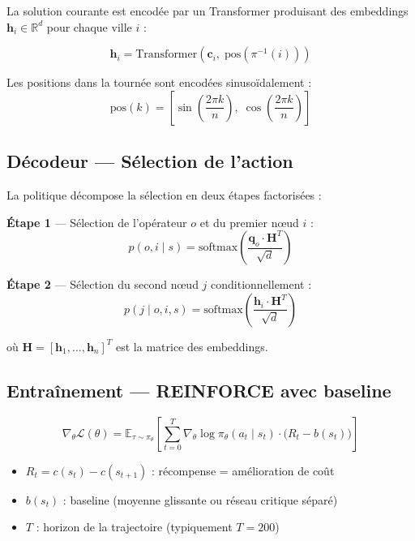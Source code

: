 \documentclass[11pt,a4paper]{article}
\begin{document}
La solution courante est encodée par un Transformer produisant des embeddings
$\mathbf{h}_i \in \mathbb{R}^d$ pour chaque ville $i$ :

\begin{equation}
  \mathbf{h}_i = \text{Transformer}\!\left(\mathbf{c}_i,\;
  \text{pos}\!\left(\pi^{-1}(i)\right)\right)
\end{equation}

Les positions dans la tournée sont encodées sinusoïdalement :
\begin{equation}
  \text{pos}(k) = \left[\sin\!\left(\frac{2\pi k}{n}\right),\;
  \cos\!\left(\frac{2\pi k}{n}\right)\right]
\end{equation}

\subsection{Décodeur --- Sélection de l'action}

La politique décompose la sélection en deux étapes factorisées :

\textbf{Étape 1} --- Sélection de l'opérateur $o$ et du premier nœud $i$ :
\begin{equation}
  p(o, i \mid s) = \text{softmax}\!\left(\frac{\mathbf{q}_o \cdot \mathbf{H}^T}{\sqrt{d}}\right)
\end{equation}

\textbf{Étape 2} --- Sélection du second nœud $j$ conditionnellement :
\begin{equation}
  p(j \mid o, i, s) = \text{softmax}\!\left(\frac{\mathbf{h}_i \cdot \mathbf{H}^T}{\sqrt{d}}\right)
\end{equation}

où $\mathbf{H} = [\mathbf{h}_1, \ldots, \mathbf{h}_n]^T$ est la matrice des embeddings.

\subsection{Entraînement --- REINFORCE avec baseline}

\begin{equation}
  \nabla_\theta \mathcal{L}(\theta) =
  \mathbb{E}_{\tau \sim \pi_\theta}\!\left[
    \sum_{t=0}^{T} \nabla_\theta \log \pi_\theta(a_t \mid s_t)
    \cdot \bigl(R_t - b(s_t)\bigr)
  \right]
\end{equation}

\begin{itemize}
  \item $R_t = c(s_t) - c(s_{t+1})$ : récompense = amélioration de coût
  \item $b(s_t)$ : baseline (moyenne glissante ou réseau critique séparé)
  \item $T$ : horizon de la trajectoire (typiquement $T = 200$)
\end{itemize}
\end{document}
